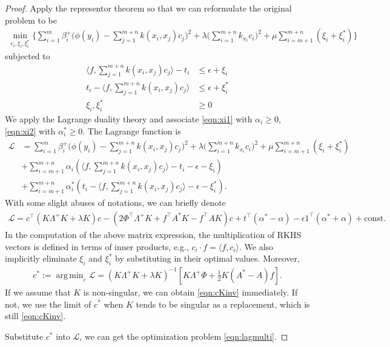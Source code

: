 \documentclass[a4paper]{article}
\renewcommand{\cal}{\mathcal}
\newcommand{\T}{\intercal}
\DeclareMathOperator*{\argmin}{arg\,min}
\begin{document}
\begin{proof}
Apply the representor theorem so that we can reformulate the original problem to be
\begin{align}
\min_{c_i,\xi_i,\xi_i^*}\bigg\{ \sum_{i=1}^m \beta_i^+ \bigg(\phi(y_i) - \sum_{j=1}^{m+n} k(x_i,x_j)c_j\bigg)^2 + \lambda\bigg(\sum_{i=1}^{m+n} k_{x_i}c_i\bigg)^2 + \mu \sum_{i=m+1}^{m+n} (\xi_i + \xi^*_i) \bigg\}
\end{align}
subjected to
\begin{align}
\langle f, \sum_{j=1}^{m+n} k(x_i,x_j)c_j \rangle - t_i &\leq \epsilon + \xi_i \label{eqn:xi1}\\
t_i - \langle f,\sum_{j=1}^{m+n} k(x_i,x_j)c_j \rangle &\leq \epsilon + \xi_i^*\label{eqn:xi2}\\
\xi_i, \xi_i^* &\geq 0
\end{align}
We apply the Lagrange duality theory \cite{boyd2004convex} and associate \eqref{eqn:xi1} with $\alpha_i \geq 0$, \eqref{eqn:xi2} with $\alpha_i^* \geq 0$. The Lagrange function is
\begin{align*}
 \cal{L} &= \sum_{i=1}^m \beta_i^+ \bigg(\phi(y_i) - \sum_{j=1}^{m+n} k(x_i,x_j)c_j\bigg)^2 + \lambda\bigg(\sum_{i=1}^{m+n} k_{x_i}c_i\bigg)^2 + \mu \sum_{i=m+1}^{m+n} (\xi_i + \xi^*_i)\\
 &+ \sum_{i=m+1}^{m+n} \alpha_i (\langle f,\sum_{j=1}^{m+n} k(x_i,x_j)c_j \rangle - t_i - \epsilon -\xi_i)\\
 &+ \sum_{i=m+1}^{m+n} \alpha_i^* (t_i - \langle f,\sum_{j=1}^{m+n} k(x_i,x_j)c_j \rangle - \epsilon - \xi_i^*).
\end{align*}
With some slight abuses of notations, we can briefly denote
\begin{align}
\cal{L} = c^\T (K\Lambda^+ K + \lambda K)c - (2\Phi^\T \Lambda^+ K + f^\T A^* K - f^\T A K)c + t^\T (\alpha^* - \alpha) - \epsilon 1^\T (\alpha^* + \alpha) + \text{const}.
\end{align}
In the computation of the above matrix expression, the multiplication of RKHS vectors is defined in terms of inner products, e.g., $c_i \cdot f = \langle f, c_i \rangle$. We also implicitly eliminate $\xi_i$ and $\xi_i^*$ by substituting in their optimal values. Moreover,
\begin{align}
c^* := \argmin_c \cal{L} = (K\Lambda^+ K + \lambda K)^{-1} \left[ K\Lambda^+ \Phi + \frac{1}{2}K(A^* - A)f \right].
\end{align}
If we assume that $K$ is non-singular, we can obtain \eqref{eqn:cKinv} immediately. If not, we use the limit of $c^*$ when $K$ tends to be singular as a replacement, which is still \eqref{eqn:cKinv}.

Substitute $c^*$ into $\cal{L}$, we can get the optimization problem \eqref{eqn:lagmulti}. 
\end{proof}
\end{document}
